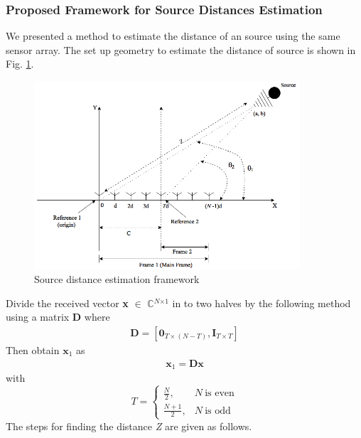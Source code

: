 \documentclass[12pt,a4paper]{article}
\theoremstyle{plain}
\theoremstyle{definition}
\begin{document}
\subsubsection{Proposed Framework for Source Distances Estimation}
We presented a method to estimate the distance of an source using the same sensor array. The set up geometry to estimate the distance of source is shown in  Fig. \ref{figc2}.
\begin{figure}[h]
\centering
\includegraphics[height=70mm]{figs/Linear_array_Distance.png}
\caption{Source distance estimation framework}
\label{figc2}
\end{figure}
Divide the received vector \textbf{x} $\in$ \( \mathbb{C} \)$^{\textit{N$\times$1}}$ in to two halves by the following method using a matrix \textbf{D} where     
\begin{align}\label{eq:11}
\textbf{D} = [\textbf{0}_{T \times (N - T)}, \textbf{I}_{T \times T}] 
\end{align} 
Then obtain $\textbf{x}_1$ as 
\begin{align}\label{eq:12}
\textbf{x}_1 = \textbf{D} \textbf{x} 
\end{align} 
with \[
    \textit{T}= 
\begin{cases}
    \frac{N}{2},& \textit{N}~\text{is even}\\
    \frac{N+1}{2},& \textit{N}~\text{is odd}
\end{cases}
\]  
The steps for finding the distance \textit{Z} are given as follows.
\end{document}
